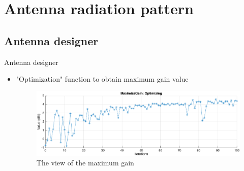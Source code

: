 \documentclass{beamer}
\newcounter{section}
\begin{document}
\section{Antenna radiation pattern}
\subsection{Antenna designer}
\setcounter{section}{2}
\setcounter{figure}{0}

\begin{frame}[t]{Antenna designer}
	\begin{itemize}
	    \item "Optimization" function to obtain maximum gain value
        \vspace{1.0\baselineskip}
            \begin{figure}
            	\centering
            	\includegraphics[scale=.5]{figures/max_gain.png}
            	\caption{The view of the maximum gain}
            \end{figure}
	\end{itemize}
\end{frame}
\end{document}
